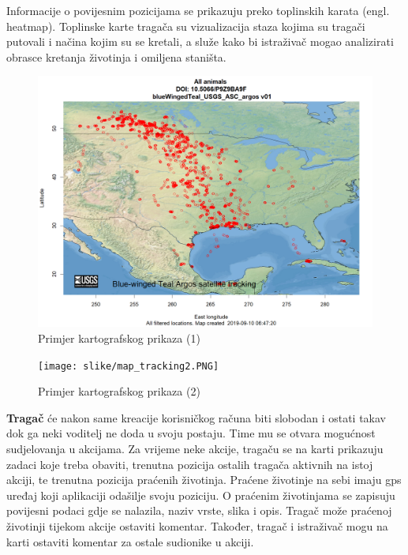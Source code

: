 		Informacije o povijesnim pozicijama se prikazuju preko toplinskih karata (engl. heatmap). Toplinske karte tragača su vizualizacija staza kojima su tragači putovali i načina kojim su se kretali, a služe kako bi istraživač mogao analizirati obrasce kretanja životinja i omiljena staništa.
		
		\begin{figure}[H]
			\includegraphics[scale=0.4]{slike/map_tracking.PNG} %
			\centering
			\caption{Primjer kartografskog prikaza (1)}
			\label{fig:promjene}
		\end{figure}
		
		\begin{figure}[H]
			\texttt{[image: slike/map\_tracking2.PNG]} %
			\centering
			\caption{Primjer kartografskog prikaza (2)}
			\label{fig:promjene}
		\end{figure}
		
		\textbf{Tragač} će nakon same kreacije korisničkog računa biti slobodan i ostati takav dok ga neki voditelj ne doda u svoju postaju. Time mu se otvara mogućnost sudjelovanja u akcijama. Za vrijeme neke akcije, tragaču se na karti prikazuju zadaci koje treba obaviti, trenutna pozicija ostalih tragača aktivnih na istoj akciji, te trenutna pozicija praćenih životinja. Praćene životinje na sebi imaju gps uređaj koji aplikaciji odašilje svoju poziciju. O
		praćenim životinjama se zapisuju povijesni podaci gdje se nalazila, naziv vrste, slika i opis. Tragač može praćenoj životinji tijekom akcije ostaviti komentar. Također, tragač i istraživač mogu na karti ostaviti komentar za ostale sudionike u akciji.		
		
